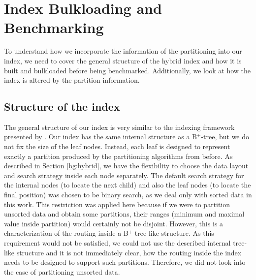 \section{Index Bulkloading and Benchmarking}
To understand how we incorporate the information of the partitioning into our index, we need to cover the general structure of the hybrid index and how it is built and bulkloaded before being benchmarked. Additionally, we look at how the index is altered by the partition information.

\subsection{Structure of the index}
The general structure of our index is very similar to the indexing framework presented by \citeauthor{Dittrich2021} \cite{Dittrich2021}. Our index has the same internal structure as a B$^+$-tree, but we do not fix the size of the leaf nodes. Instead, each leaf is designed to represent exactly a partition produced by the partitioning algorithms from before. As described in Section \ref{bg:hybrid}, we have the flexibility to choose the data layout and search strategy inside each node separately. The default search strategy for the internal nodes (to locate the next child) and also the leaf nodes (to locate the final position) was chosen to be binary search, as we deal only with sorted data in this work. This restriction was applied here because if we were to partition unsorted data and obtain some partitions, their ranges (minimum and maximal value inside partition) would certainly not be disjoint. However, this is a characterization of the routing inside a B$^+$-tree like structure. As this requirement would not be satisfied, we could not use the described internal tree-like structure and it is not immediately clear, how the routing inside the index needs to be designed to support such partitions. Therefore, we did not look into the case of partitioning unsorted data.

